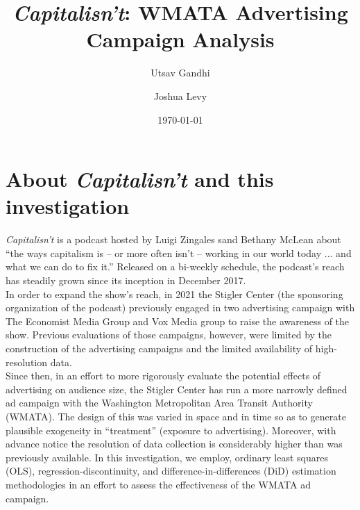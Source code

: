 \documentclass[11pt, letterpaper, twoside]{article}
\title{\singlespacing\textit{Capitalisn't}: WMATA Advertising Campaign Analysis}
\author{
   Utsav Gandhi
   \and
   Joshua Levy
}
\date{\today}
\begin{document}
\begin{titlepage}   
    \maketitle
    \thispagestyle{empty}
\end{titlepage}



\newpage
{}

\section{About \textit{Capitalisn't} and this investigation}
\textit{Capitalisn't} is a podcast hosted by Luigi Zingales sand Bethany McLean about ``the ways capitalism is -- or more often isn't -- working in our world today ... and what we can do to fix it.'' Released on a bi-weekly schedule, the podcast's reach has steadily grown since its inception in December 2017.\\

In order to expand the show's reach, in 2021 the Stigler Center (the sponsoring organization of the podcast) previously engaged in two advertising campaign with The Economist Media Group and Vox Media group to raise the awareness of the show. Previous evaluations of those campaigns, however, were limited by the construction of the advertising campaigns and the limited availability of high-resolution data.\\

Since then, in an effort to more rigorously evaluate the potential effects of advertising on audience size, the Stigler Center has run a more narrowly defined ad campaign with the Washington Metropolitan Area Transit Authority (WMATA). The design of this was varied in space and in time so as to generate plausible exogeneity in ``treatment'' (exposure to advertising). Moreover, with advance notice the resolution of data collection is considerably higher than was previously available. In this investigation, we employ, ordinary least squares (OLS), regression-discontinuity, and difference-in-differences (DiD) estimation methodologies in an effort to assess the effectiveness of the WMATA ad campaign.
\end{document}
